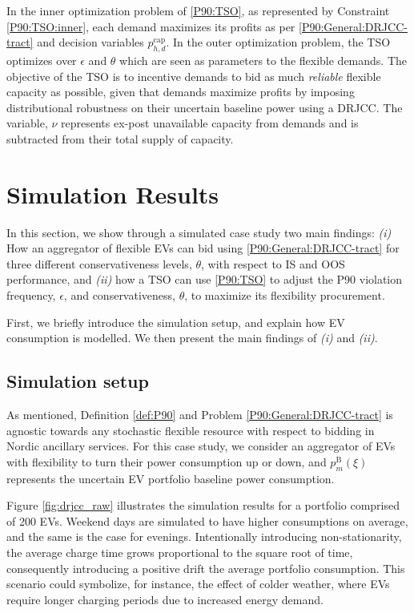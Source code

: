 \documentclass[conference]{IEEEtran}
\begin{document}
In the inner optimization problem of \eqref{P90:TSO}, as represented by Constraint \eqref{P90:TSO:inner}, each demand maximizes its profits as per \eqref{P90:General:DRJCC-tract} and decision variables $p_{h,d}^{\text{cap}}$. In the outer optimization problem, the \ac{TSO} optimizes over $\epsilon$ and $\theta$ which are seen as parameters to the flexible demands. The objective of the \ac{TSO} is to incentive demands to bid as much \textit{reliable} flexible capacity as possible, given that demands maximize profits by imposing distributional robustness on their uncertain baseline power using a \ac{DRJCC}. The variable, $\nu$ represents ex-post unavailable capacity from demands and is subtracted from their total supply of capacity.


\section{Simulation Results}

In this section, we show through a simulated case study two main findings: \textit{(i)} How an aggregator of flexible \acp{EV} can bid using \eqref{P90:General:DRJCC-tract} for three different conservativeness levels, $\theta$, with respect to \ac{IS} and \ac{OOS} performance, and \textit{(ii)} how a \ac{TSO} can use \eqref{P90:TSO} to adjust the P90 violation frequency, $\epsilon$, and conservativeness, $\theta$, to maximize its flexibility procurement.

First, we briefly introduce the simulation setup, and explain how \ac{EV} consumption is modelled. We then present the main findings of \textit{(i)} and \textit{(ii)}.

\subsection{Simulation setup}\label{sec:sim-setup}

As mentioned, Definition \ref{def:P90} and Problem \eqref{P90:General:DRJCC-tract} is agnostic towards any stochastic flexible resource with respect to bidding in Nordic ancillary services. For this case study, we consider an aggregator of \acp{EV} with flexibility to turn their power consumption up or down, and $p_{m}^{\text{B}}(\xi)$ represents the uncertain \ac{EV} portfolio baseline power consumption.

Figure \ref{fig:drjcc_raw} illustrates the simulation results for a portfolio comprised of 200 \acp{EV}. Weekend days are simulated to have higher consumptions on average, and the same is the case for evenings. Intentionally introducing non-stationarity, the average charge time grows proportional to the square root of time, consequently introducing a positive drift the average portfolio consumption. This scenario could symbolize, for instance, the effect of colder weather, where \acp{EV} require longer charging periods due to increased energy demand.
\end{document}
